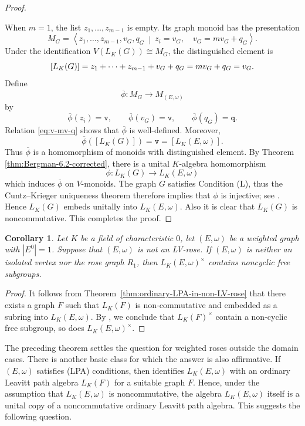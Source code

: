 \documentclass{article}
\newtheorem{corollary}{Corollary}
\theoremstyle{definition}
\begin{document}
\begin{proof}
\begin{figure}[H]
\begin{tikzpicture}[>=stealth, every node/.style={font=\small}, scale=1.2]
\end{tikzpicture}
\end{figure}
When $m=1$, the list
$z_1,\ldots,z_{m-1}$ is empty. Its graph monoid has the presentation
$$
M_G=
\left\langle
z_1,\ldots,z_{m-1},v_G,q_G
\ \middle|\
z_i=v_G,\quad v_G=mv_G+q_G
\right\rangle .
$$
Under the identification $V(L_K(G))\cong M_G$, the distinguished element is
$$
\relax[L_K(G)]=z_1+\cdots+z_{m-1}+v_G+q_G=mv_G+q_G=v_G.
$$
Define
$$
\overline{\phi}:M_G\longrightarrow M_{(E,\omega)}
$$
by
$$
\overline{\phi}(z_i)=\mathtt{v},
\qquad
\overline{\phi}(v_G)=\mathtt{v},
\qquad
\overline{\phi}(q_G)=\mathtt{q}.
$$
Relation \eqref{eq:v-mv-q} shows that $\overline{\phi}$ is well-defined.
Moreover,
$$
\overline{\phi}([L_K(G)])
=\mathtt{v}
=[L_K(E,\omega)].
$$
Thus $\overline{\phi}$ is a homomorphism of monoids with distinguished
element. By Theorem \ref{thm:Bergman-6.2-corrected}, there is a unital $K$-algebra homomorphism
$$
\phi:L_K(G)\longrightarrow L_K(E,\omega)
$$
which induces $\overline{\phi}$ on $V$-monoids. The graph $G$ satisfies Condition \textup{(L)}, thus the Cuntz--Krieger uniqueness
theorem therefore implies that $\phi$ is injective; see
\cite[Theorem~2.2.16]{AAS}. Hence $L_K(G)$ embeds unitally into
$L_K(E,\omega)$. Also it is clear that $L_K(G)$ is noncommutative. This completes the proof.
\end{proof}

\begin{corollary}\label{cor:non-lv-rose-free-subgroup}
Let $K$ be a field of characteristic $0$, let $(E,\omega)$ be a weighted graph with
$|E^0|=1$. Suppose that $(E,\omega)$ is not an
LV-rose. If $(E,\omega)$ is neither an isolated vertex nor the rose graph $R_1$, then $L_K(E,\omega)^\times$ contains noncyclic free subgroups.
\end{corollary}
\begin{proof}
It follows from Theorem~\ref{thm:ordinary-LPA-in-non-LV-rose} that there exists a graph $F$ such that $L_K(F)$ is non-commutative and embedded as a subring into $L_K(E,\omega)$. By \cite[Theorem 3.4]{HK}, we conclude that $L_K(F)^\times$ contain a non-cyclic free subgroup, so does $L_K(E,\omega)^\times$.
\end{proof}

The preceding theorem settles the question for weighted roses outside the domain cases. There is another basic class for which the answer is also affirmative. If $(E,\omega)$ satisfies \textup{(LPA)} conditions, then \cite[Theorem~5.2.1]{Pre4} identifies $L_K(E,\omega)$ with an ordinary Leavitt path algebra $L_K(F)$ for a suitable graph $F$. Hence, under the assumption that $L_K(E,\omega)$ is noncommutative, the algebra $L_K(E,\omega)$ itself is a unital copy of a noncommutative ordinary Leavitt path algebra. This suggests the following question.
\end{document}
